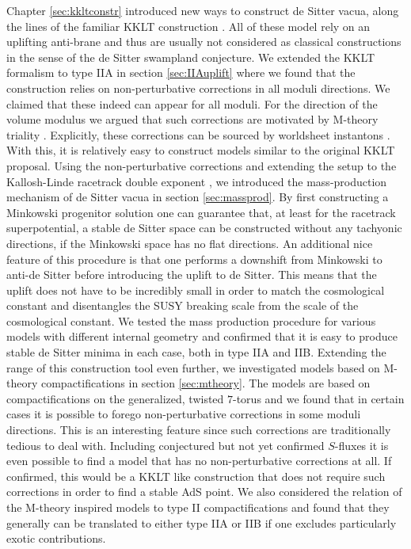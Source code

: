 \documentclass[a4paper,12pt,twoside,openright]{report}
\begin{document}
Chapter \ref{sec:kkltconstr} introduced new ways to construct de Sitter vacua, along the lines of the familiar KKLT construction \cite{Cribiori:2019bfx,Kallosh:2019zgd,Cribiori:2019drf,Cribiori:2019hrb}. All of these model rely on an uplifting anti-brane and thus are usually not considered as classical constructions in the sense of the de Sitter swampland conjecture. We extended the KKLT formalism to type IIA in section \ref{sec:IIAuplift} where we found that the construction relies on non-perturbative corrections in all moduli directions. We claimed that these indeed can appear \cite{Palti:2008mg} for all moduli. For the direction of the volume modulus we argued that such corrections are motivated by M-theory triality \cite{Hull:1994ys,Schwarz:1996bh,Acharya:2007rc}. Explicitly, these corrections can be sourced by worldsheet instantons \cite{Kachru:2000ih,Blumenhagen:2009qh}. With this, it is relatively easy to construct models similar to the original KKLT proposal. Using the non-perturbative corrections and extending the setup to the Kallosh-Linde racetrack double exponent \cite{Kallosh:2004yh}, we introduced the mass-production mechanism of de Sitter vacua in section \ref{sec:massprod}. By first constructing a Minkowski progenitor solution one can guarantee that, at least for the racetrack superpotential, a stable de Sitter space can be constructed without any tachyonic directions, if the Minkowski space has no flat directions. An additional nice feature of this procedure is that one performs a downshift from Minkowski to anti-de Sitter before introducing the uplift to de Sitter. This means that the uplift does not have to be incredibly small in order to match the cosmological constant and disentangles the SUSY breaking scale from the scale of the cosmological constant. We tested the mass production procedure for various models with different internal geometry and confirmed that it is easy to produce stable de Sitter minima in each case, both in type IIA and IIB. Extending the range of this construction tool even further, we investigated models based on M-theory compactifications in section \ref{sec:mtheory}. The models are based on compactifications on the generalized, twisted $7$-torus \cite{DallAgata:2005zlf,Duff:2010vy,Derendinger:2014wwa,Ferrara:2016fwe} and we found that in certain cases it is possible to forego non-perturbative corrections in some moduli directions. This is an interesting feature since such corrections are traditionally tedious to deal with. Including conjectured but not yet confirmed $S$-fluxes it is even possible to find a model that has no non-perturbative corrections at all. If confirmed, this would be a KKLT like construction that does not require such corrections in order to find a stable AdS point. We also considered the relation of the M-theory inspired models to type II compactifications and found that they generally can be translated to either type IIA or IIB if one excludes particularly exotic contributions.\\
\end{document}

